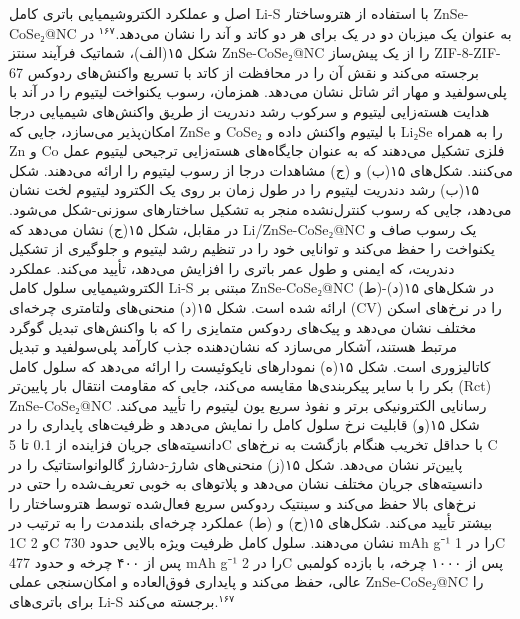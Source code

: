 \documentclass[12pt,a4paper,twocolumn]{article} %
\newcommand{\persian}[1]{\textfarsi{#1}}
\newcommand{\english}[1]{\textenglish{#1}}
\begin{document}
\persian{
اصل و عملکرد الکتروشیمیایی باتری کامل \english{Li-S} با استفاده از هتروساختار \english{ZnSe-CoSe₂@NC} به عنوان یک میزبان دو در یک برای هر دو کاتد و آند را نشان می‌دهد.$^{۱۶۷}$ در شکل ۱۵(الف)، شماتیک فرآیند سنتز \english{ZnSe-CoSe₂@NC} را از یک پیش‌ساز \english{ZIF-8-ZIF-67} برجسته می‌کند و نقش آن را در محافظت از کاتد با تسریع واکنش‌های ردوکس پلی‌سولفید و مهار اثر شاتل نشان می‌دهد. همزمان، رسوب یکنواخت لیتیوم را در آند با هدایت هسته‌زایی لیتیوم و سرکوب رشد دندریت از طریق واکنش‌های شیمیایی درجا امکان‌پذیر می‌سازد، جایی که \english{ZnSe} و \english{CoSe₂} با لیتیوم واکنش داده و \english{Li₂Se} را به همراه \english{Zn} و \english{Co} فلزی تشکیل می‌دهند که به عنوان جایگاه‌های هسته‌زایی ترجیحی لیتیوم عمل می‌کنند. شکل‌های ۱۵(ب) و (ج) مشاهدات درجا از رسوب لیتیوم را ارائه می‌دهند. شکل ۱۵(ب) رشد دندریت لیتیوم را در طول زمان بر روی یک الکترود لیتیوم لخت نشان می‌دهد، جایی که رسوب کنترل‌نشده منجر به تشکیل ساختارهای سوزنی-شکل می‌شود. در مقابل، شکل ۱۵(ج) نشان می‌دهد که \english{Li/ZnSe-CoSe₂@NC} یک رسوب صاف و یکنواخت را حفظ می‌کند و توانایی خود را در تنظیم رشد لیتیوم و جلوگیری از تشکیل دندریت، که ایمنی و طول عمر باتری را افزایش می‌دهد، تأیید می‌کند. عملکرد الکتروشیمیایی سلول کامل \english{Li-S} مبتنی بر \english{ZnSe-CoSe₂@NC} در شکل‌های ۱۵(د)-(ط) ارائه شده است. شکل ۱۵(د) منحنی‌های ولتامتری چرخه‌ای (\english{CV}) را در نرخ‌های اسکن مختلف نشان می‌دهد و پیک‌های ردوکس متمایزی را که با واکنش‌های تبدیل گوگرد مرتبط هستند، آشکار می‌سازد که نشان‌دهنده جذب کارآمد پلی‌سولفید و تبدیل کاتالیزوری است. شکل ۱۵(ه) نمودارهای نایکوئیست را ارائه می‌دهد که سلول کامل بکر را با سایر پیکربندی‌ها مقایسه می‌کند، جایی که مقاومت انتقال بار پایین‌تر (\english{Rct}) \english{ZnSe-CoSe₂@NC} رسانایی الکترونیکی برتر و نفوذ سریع یون لیتیوم را تأیید می‌کند. شکل ۱۵(و) قابلیت نرخ سلول کامل را نمایش می‌دهد و ظرفیت‌های پایداری را در دانسیته‌های جریان فزاینده از \english{0.1} تا \english{5C} با حداقل تخریب هنگام بازگشت به نرخ‌های \english{C} پایین‌تر نشان می‌دهد. شکل ۱۵(ز) منحنی‌های شارژ-دشارژ گالوانواستاتیک را در دانسیته‌های جریان مختلف نشان می‌دهد و پلاتوهای به خوبی تعریف‌شده را حتی در نرخ‌های بالا حفظ می‌کند و سینتیک ردوکس سریع فعال‌شده توسط هتروساختار را بیشتر تأیید می‌کند. شکل‌های ۱۵(ح) و (ط) عملکرد چرخه‌ای بلندمدت را به ترتیب در \english{1C} و \english{2C} نشان می‌دهند. سلول کامل ظرفیت ویژه بالایی حدود \english{730 mAh g⁻¹} را در \english{1C} پس از ۴۰۰ چرخه و حدود \english{477 mAh g⁻¹} را در \english{2C} پس از ۱۰۰۰ چرخه، با بازده کولمبی عالی، حفظ می‌کند و پایداری فوق‌العاده و امکان‌سنجی عملی \english{ZnSe-CoSe₂@NC} را برای باتری‌های \english{Li-S} برجسته می‌کند.$^{۱۶۷}$
}
\end{document}
